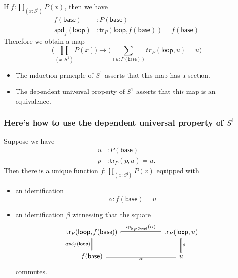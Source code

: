 \documentclass[handout]{beamer}
\newcommand{\sphere}[1]{S^{#1}}
\newcommand{\ap}{\mathsf{ap}}
\newcommand{\baseS}{\mathsf{base}}
\newcommand{\loopS}{\mathsf{loop}}
\newcommand{\apd}{\mathsf{apd}}
\newcommand{\tr}{\mathsf{tr}}
\newcommand{\apply}[2]{#1(#2)}
\begin{document}
\begin{frame}
  If $f:\prod_{(x:\sphere{1})}\apply{P}{x}$, then we have
  \begin{align*}
    \apply{f}{\baseS} & : \apply{P}{\baseS} \\
    \apply{\apd_f}{\loopS} & : \apply{\tr_P}{\loopS,\apply{f}{\baseS}}= \apply{f}{\baseS}
  \end{align*}\pause
  Therefore we obtain a map
  \begin{equation*}
    \Big(\prod_{(x:\sphere{1})}\apply{P}{x}\Big)\to\Big(\sum_{(u:\apply{P}{\baseS})}\apply{tr_P}{\loopS,u}=u\Big)
  \end{equation*}\pause
  \begin{itemize}
  \item The induction principle of $\sphere{1}$ asserts that this map has a section.
  \item The dependent universal property of $\sphere{1}$ asserts that this map is an equivalence.
  \end{itemize}
\end{frame}

\begin{frame}
  \frametitle{Here's how to use the dependent universal property of $\sphere{1}$}
  Suppose we have
  \begin{align*}
    u & : \apply{P}{\baseS} \\
    p & : \apply{\tr_P}{p,u}=u.
  \end{align*}
  Then there is a unique function $f:\prod_{(x:\sphere{1})}\apply{P}{x}$ equipped with\pause
  \begin{itemize}
  \item an identification
    \begin{equation*}
      \alpha : \apply{f}{\baseS} = u
    \end{equation*}\pause
  \item an identification $\beta$ witnessing that the square
    \begin{equation*}
      \begin{tikzcd}[ampersand replacement=\&,column sep=6em]
        \apply{\tr_P}{\loopS,\apply{f}{\baseS}} \arrow[d,equals,swap,"\apply{apd_f}{\loopS}"] \arrow[r,equals,"\apply{\ap_{\apply{\tr_P}{\loopS}}}{\alpha}"] \& \apply{\tr_P}{\loopS,u} \arrow[d,equals,"p"] \\
        \apply{f}{\baseS} \arrow[r,equals,swap,"\alpha"] \& u
      \end{tikzcd}
    \end{equation*}
    commutes.
  \end{itemize}
\end{frame}
\end{document}
